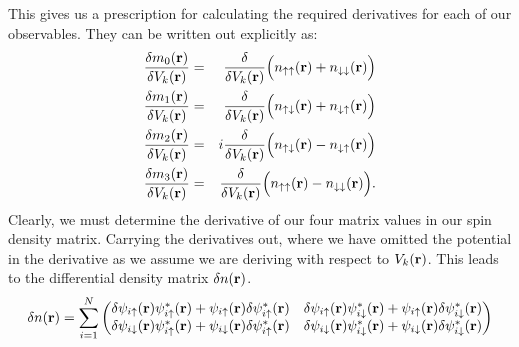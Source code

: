 \documentclass[10pt]{revtex4-1}
\newcommand{\bfr}{{\bf r}}
\newcommand{\ua}{\uparrow}
\newcommand{\da}{\downarrow}
\begin{document}
This gives us a prescription for calculating the required derivatives for each of our observables.
They can be written out explicitly as:
\begin{eqnarray}
  \nonumber
  \frac{\delta m_0(\bfr)}{\delta V_k(\bfr)} & = & \frac{\delta}{\delta V_k(\bfr)}\Big{(} n_{\ua \ua}(\bfr)+n_{\da \da}(\bfr) \Big{)} \\
  \nonumber
  \frac{\delta m_1(\bfr)}{\delta V_k(\bfr)} & = & \frac{\delta}{\delta V_k(\bfr)}\Big{(} n_{\ua \da}(\bfr)+n_{\da \ua}(\bfr) \Big{)} \\
  \nonumber
  \frac{\delta m_2(\bfr)}{\delta V_k(\bfr)} & = & i \frac{\delta}{\delta V_k(\bfr)}\Big{(} n_{\ua \da}(\bfr)-n_{\da \ua}(\bfr) \Big{)} \\
  \frac{\delta m_3(\bfr)}{\delta V_k(\bfr)} & = & \frac{\delta}{\delta V_k(\bfr)}\Big{(} n_{\ua \ua}(\bfr)-n_{\da \da}(\bfr) \Big{)} .
\end{eqnarray}
Clearly, we must determine the derivative of our four matrix values in our spin density matrix.
Carrying the derivatives out, where we have omitted the potential in the derivative as we assume we are deriving with respect to $V_k(\bfr)$.
This leads to the differential density matrix $\delta n(\bfr)$.
\begin{equation}
  \delta n(\bfr) = \sum_{i=1}^N
  \begin{pmatrix}
    \delta \psi_{i \ua}(\bfr) \psi_{i \ua}^*(\bfr) + \psi_{i \ua}(\bfr) \delta \psi_{i \ua}^*(\bfr) &
    \delta \psi_{i \ua}(\bfr) \psi_{i \da}^*(\bfr) + \psi_{i \ua}(\bfr) \delta \psi_{i \da}^*(\bfr) \\
    \delta \psi_{i \da}(\bfr) \psi_{i \ua}^*(\bfr) + \psi_{i \da}(\bfr) \delta \psi_{i \ua}^*(\bfr) &
    \delta \psi_{i \da}(\bfr) \psi_{i \da}^*(\bfr) + \psi_{i \da}(\bfr) \delta \psi_{i \da}^*(\bfr)
  \end{pmatrix}
\end{equation}
\end{document}
